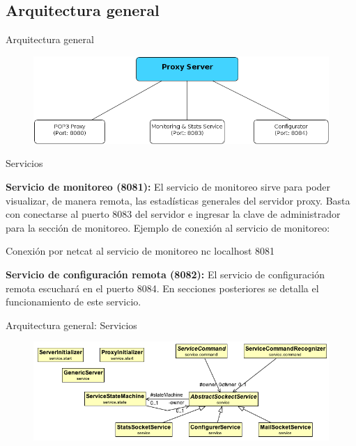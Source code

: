 \documentclass{beamer}
\begin{document}
\subsection{Arquitectura general}
\begin{frame}{Arquitectura general}
\begin{figure}[H]
\begin{center}
\includegraphics[scale=0.40]{./images/Servers.png}
\label{modelado}
\end{center}
\end{figure}
\end{frame}

\begin{frame}{Servicios}

\par \textbf{Servicio de monitoreo (8081):} El servicio de monitoreo sirve para poder visualizar, de manera remota, las estadísticas generales del servidor proxy. Basta con conectarse al puerto 8083 del servidor e ingresar la clave de administrador para la sección de monitoreo. Ejemplo de conexión al servicio de monitoreo:

\begin{block}{Conexión por netcat al servicio de monitoreo}
nc localhost 8081
\end{block}

\par \textbf{Servicio de configuración remota (8082):} El servicio de configuración remota escuchará en el puerto 8084. En secciones posteriores se detalla el funcionamiento de este servicio.

\end{frame}

\begin{frame}{Arquitectura general: Servicios}
\begin{figure}[H]
\begin{center}
\includegraphics[scale=0.45]{./images/SocketService.png}
\label{modelado}
\end{center}
\end{figure}
\end{frame}
\end{document}
